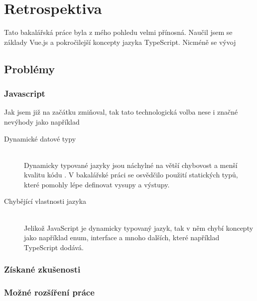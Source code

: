 \chapter{Retrospektiva}

Tato bakalářská práce byla z mého pohledu velmi přínosná. Naučil jsem se základy Vue.js a pokročilejší koncepty jazyka TypeScript. Nicméně se vývoj 

\section{Problémy}
\subsection{Javascript}
Jak jsem již na začátku zmiňoval, tak tato technologická volba nese i značné nevýhody jako například

\begin{description}
  \item[Dynamické datové typy] \hfill \\ Dynamicky typované jazyky jsou náchylné na větší chybovost a menší kvalitu kódu \cite{pang2018programming}. V bakalářské práci se osvědčilo použití statických typů, které pomohly lépe definovat vysupy a výstupy.
  \item[Chybějící vlastnosti jazyka] \hfill \\ Jelikož JavaScript je dynamicky typovaný jazyk, tak v něm chybí koncepty jako například enum, interface a mnoho dalších, které například TypeScript dodává.
\end{description}

\subsection{Získané zkušenosti}

\subsection{Možné rozšíření práce}